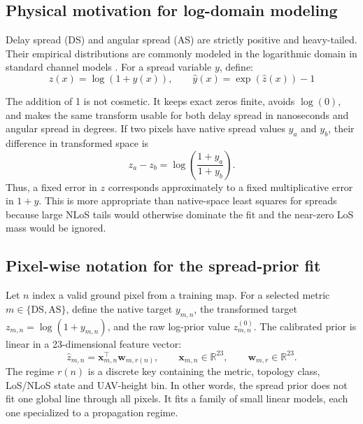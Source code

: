 \subsection{Physical motivation for log-domain modeling}

Delay spread (DS) and angular spread (AS) are strictly positive and heavy-tailed. Their empirical distributions are commonly modeled in the logarithmic domain in standard channel models \cite{tr38901,winner2}. For a spread variable $y$, define:
\begin{equation}
z(x) = \log(1 + y(x)),\qquad \hat y(x) = \exp(\hat z(x)) - 1
\label{eq:log_transform_79}
\end{equation}

The addition of 1 is not cosmetic. It keeps exact zeros finite, avoids
\(\log(0)\), and makes the same transform usable for both delay spread in
nanoseconds and angular spread in degrees. If two pixels have native spread
values \(y_a\) and \(y_b\), their difference in transformed space is
\begin{equation}
z_a-z_b
=
\log\!\left(\frac{1+y_a}{1+y_b}\right).
\label{eq:log_ratio_79}
\end{equation}
Thus, a fixed error in \(z\) corresponds approximately to a fixed
multiplicative error in \(1+y\). This is more appropriate than native-space
least squares for spreads because large NLoS tails would otherwise dominate
the fit and the near-zero LoS mass would be ignored.

\subsection{Pixel-wise notation for the spread-prior fit}

Let \(n\) index a valid ground pixel from a training map. For a selected
metric \(m \in \{\mathrm{DS},\mathrm{AS}\}\), define the native target
\(y_{m,n}\), the transformed target \(z_{m,n}=\log(1+y_{m,n})\), and the
raw log-prior value \(z^{(0)}_{m,n}\). The calibrated prior is linear in a
23-dimensional feature vector:
\begin{equation}
\hat z_{m,n}
=
\textbf{x}_{m,n}^{\top}\textbf{w}_{m,r(n)},
\qquad
\textbf{x}_{m,n}\in\mathbb{R}^{23},
\qquad
\textbf{w}_{m,r}\in\mathbb{R}^{23}.
\label{eq:try79_pixel_linear}
\end{equation}
The regime \(r(n)\) is a discrete key containing the metric, topology class,
LoS/NLoS state and UAV-height bin. In other words, the spread prior does not fit one
global line through all pixels. It fits a family of small linear models, each
one specialized to a propagation regime.

